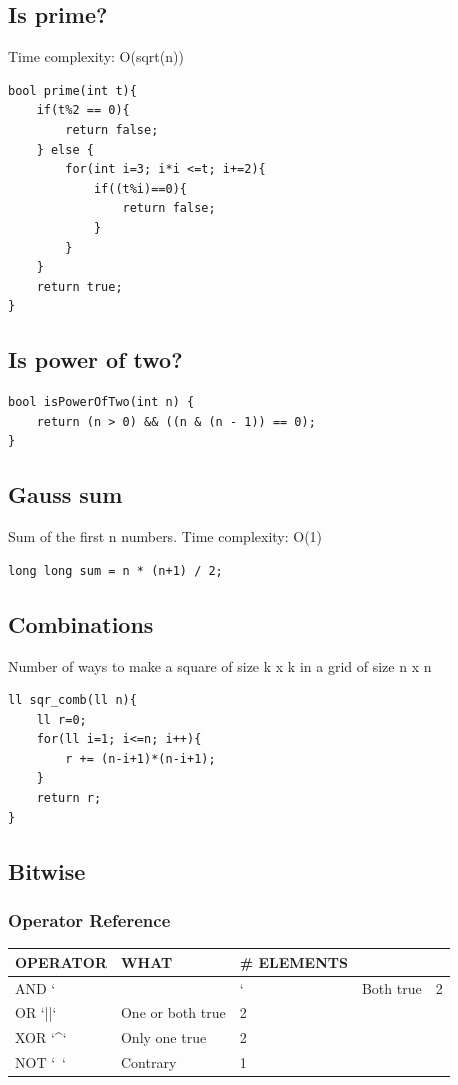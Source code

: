 \documentclass[10pt]{article}
\begin{document}
\begin{multicols*}{2}
\subsection{Is prime?}
Time complexity: O(sqrt(n))
\begin{lstlisting}[style=compactcpp]
bool prime(int t){
    if(t%2 == 0){
        return false;
    } else {
        for(int i=3; i*i <=t; i+=2){
            if((t%i)==0){
                return false;
            }
        }
    }
    return true;
}
\end{lstlisting}

\subsection{Is power of two?}
\begin{lstlisting}[style=compactcpp]
bool isPowerOfTwo(int n) {
    return (n > 0) && ((n & (n - 1)) == 0);
}
\end{lstlisting}

\subsection{Gauss sum}
Sum of the first n numbers. Time complexity: O(1)
\begin{lstlisting}[style=compactcpp]
long long sum = n * (n+1) / 2;
\end{lstlisting}

\subsection{Combinations}
Number of ways to make a square of size k x k in a grid of size n x n
\begin{lstlisting}[style=compactcpp]
ll sqr_comb(ll n){
    ll r=0;
    for(ll i=1; i<=n; i++){
        r += (n-i+1)*(n-i+1);
    }
    return r;
}
\end{lstlisting}

\subsection{Bitwise}
\subsubsection{Operator Reference}
\begin{tabularx}{\linewidth}{|l|l|l|}
    \hline
    \textbf{OPERATOR} & \textbf{WHAT} & \textbf{\# ELEMENTS} \\
    \hline
    AND `&&` & Both true & 2 \\
    \hline
    OR `||` & One or both true & 2 \\
    \hline
    XOR `^`  & Only one true & 2 \\
    \hline
    NOT `~`  & Contrary & 1 \\
    \hline
\end{tabularx}


\end{multicols*}
\end{document}

